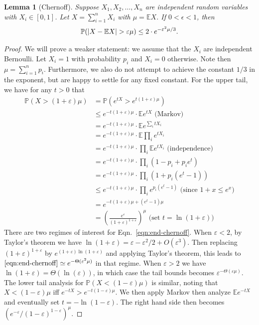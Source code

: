 \documentclass[11pt]{article}
\newcommand{\eps}{\varepsilon}
\DeclarePairedDelimiter\abs{\lvert}{\rvert}
\newtheorem{lemma}[theorem]{Lemma}
\begin{document}
\begin{lemma}[Chernoff]
Suppose $X_1, X_2, \ldots, X_n$ are independent random variables with $X_i \in [0, 1]$. Let $X = \sum_{i = 1}^{n}{X_i}$ with $\mu = \mathbb{E}X$. If $0 < \epsilon < 1$, then
\begin{align}
    \mathbb{P}(\abs{X - \mathbb{E}X} > \eps\mu) \leq 2 \cdot e^{-\eps^2\mu/3}.
\end{align}
\end{lemma}

\begin{proof}
We will prove a weaker statement: we assume that the $X_i$ are independent Bernoulli. Let $X_i = 1$ with probability $p_i$ and $X_i = 0$ otherwise. Note then $\mu = \sum_{i = 1}^{n}{p_i}$. Furthermore, we also do not attempt to achieve the constant $1/3$ in the exponent, but are happy to settle for any fixed constant. For the upper tail, we have for any $t > 0$ that
\begin{align}
\nonumber \mathbb{P}(X > (1+\eps)\mu) &= \mathbb{P}\left(e^{tX} > e^{t(1+\eps)\mu}\right)\\
\nonumber{}&\le e^{-t(1+\eps)\mu}\cdot \mathbb{E} e^{tX}\text{ (Markov)}\\
\nonumber{}& = e^{-t(1+\eps)\mu}\cdot \mathbb{E} e^{\sum_i t X_i}\\
\nonumber{}& = e^{-t(1+\eps)\mu}\cdot \mathbb{E} \prod_i e^{t X_i}\\
\nonumber{}& = e^{-t(1+\eps)\mu}\cdot \prod_i \mathbb{E} e^{t X_i}\text{ (independence)}\\
\nonumber{}& = e^{-t(1+\eps)\mu}\cdot \prod_i (1-p_i + p_i e^t)\\
\nonumber{}& = e^{-t(1+\eps)\mu}\cdot \prod_i (1 + p_i(e^t-1))\\
\nonumber{}& \le e^{-t(1+\eps)\mu}\cdot \prod_i e^{p_i(e^t-1)}\text{ (since }1+x\le e^x\text{)}\\
\nonumber{}& = e^{-t(1+\eps)\mu + (e^t - 1)\mu}\\
{}& = \left(\frac{e^\eps}{(1+\eps)^{1+\eps}}\right)^\mu\text{ (set }t = \ln(1+\eps)\text{)} \label{eqn:end-chernoff}
\end{align}
There are two regimes of interest for Eqn.~\eqref{eqn:end-chernoff}. When $\eps<2$, by Taylor's theorem we have $\ln(1+\eps) = \eps - \eps^2/2 + O(\eps^3)$. Then replacing $(1+\eps)^{1+\eps}$ by $e^{(1+\eps)\ln(1+\eps)}$ and applying Taylor's theorem, this leads to $\eqref{eqn:end-chernoff}\simeq e^{-\Theta(\eps^2\mu)}$ in that regime. When $\eps>2$ we have $\ln(1+\eps)=\Theta(\ln(\eps))$, in which case the tail bounds becomes $\eps^{-\Theta(\eps\mu)}$. The lower tail analysis for $\mathbb{P}(X < (1-\eps)\mu)$ is similar, noting that $X < (1-\eps)\mu$ iff $e^{-tX} > e^{-t(1-\eps)\mu}$. We then apply Markov then analyze $\mathbb{E} e^{-tX}$ and eventually set $t = -\ln(1-\eps)$. The right hand side then becomes $(e^{-\eps}/(1-\eps)^{1-\eps})^\mu$.
\end{proof}
\end{document}
